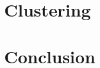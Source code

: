 \documentclass[11pt]{article}
\begin{document}
\section{Clustering}


\section{Conclusion}




\end{document}

